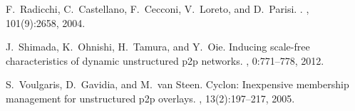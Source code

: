 \documentclass[10pt, conference, compsocconf]{IEEEtran}
\begin{document}
\begin{thebibliography}{10}
F.~Radicchi, C.~Castellano, F.~Cecconi, V.~Loreto, and D.~Parisi.
.
, 101(9):2658,
  2004.

J.~Shimada, K.~Ohnishi, H.~Tamura, and Y.~Oie.
\newblock Inducing scale-free characteristics of dynamic unstructured p2p
  networks.
, 0:771--778, 2012.

S.~Voulgaris, D.~Gavidia, and M.~van Steen.
\newblock Cyclon: Inexpensive membership management for unstructured p2p
  overlays.
, 13(2):197--217, 2005.

\end{thebibliography}
\end{document}
